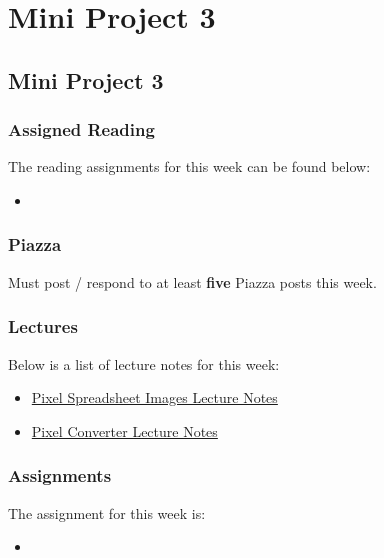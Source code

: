 \clearpage

\renewcommand{\ChapTitle}{Mini Project 3}
\renewcommand{\SectionTitle}{Mini Project 3}

\chapter{\ChapTitle}
\section{\SectionTitle}

\subsection{Assigned Reading}

The reading assignments for this week can be found below:

\begin{itemize}
    \item {}
\end{itemize}

\subsection{Piazza}

Must post / respond to at least \textbf{five} Piazza posts this week.

\subsection{Lectures}

\noindent Below is a list of lecture notes for this week:

\begin{itemize}
    \item \href{https://drive.google.com/drive/u/2/folders/1l_JWvAp1gkHM8J09HDKTnmJ_2JoEXgG7}{Pixel Spreadsheet Images Lecture Notes}
    \item \href{https://think-maths.co.uk/spreadsheet/}{Pixel Converter Lecture Notes}
\end{itemize}

\subsection{Assignments}

The assignment for this week is:

\begin{itemize}
    \item {}
\end{itemize}